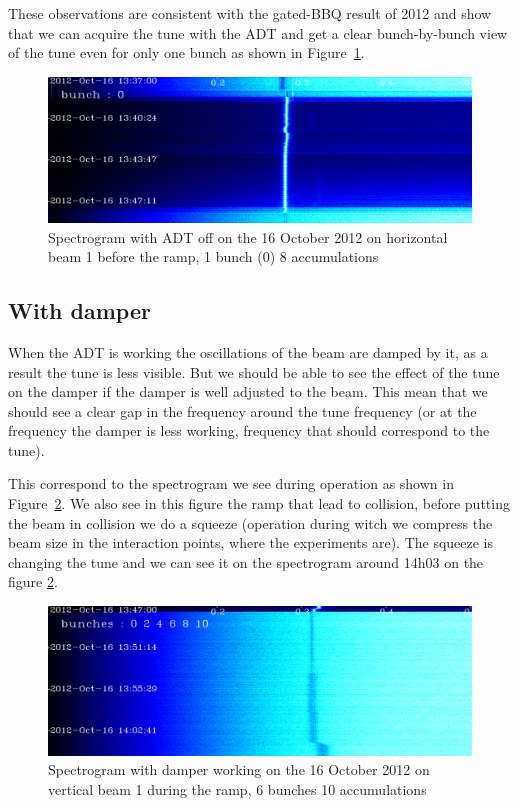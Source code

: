 These observations are consistent with the gated-\gls{BBQ} result of 2012 \cite{Valuch12} and show that we can acquire the tune with the \gls{ADT} and get a clear bunch-by-bunch view of the tune even for only one bunch as shown in Figure~\ref{fig:bunch_0_adt_off}.

\begin{figure}[H]
\caption{Spectrogram with ADT off on the 16 October 2012 on horizontal beam 1 before the ramp, 1 bunch (0) 8 accumulations}
\label{fig:bunch_0_adt_off}
\centering
\includegraphics[scale=0.3]{md-121016-hb1-m1-bunch000001-8acc-1337-1349.pdf}
\end{figure}

\subsection{With damper}

When the \gls{ADT} is working the oscillations of the beam are damped by it, as a result the tune is less visible. But we should be able to see the effect of the tune on the damper if the damper is well adjusted to the beam. This mean that we should see a clear gap in the frequency around the tune frequency (or at the frequency the damper is less working, frequency that should correspond to the tune).

This correspond to the spectrogram we see during operation as shown in Figure~\ref{fig:ramp}. We also see in this figure the ramp that lead to collision, before putting the beam in collision we do a squeeze (operation during witch we compress the beam size in the interaction points, where the experiments are). The squeeze is changing the tune and we can see it on the spectrogram around 14h03 on the figure \ref{fig:ramp}.

\begin{figure}[H]
\caption{Spectrogram with damper working on the 16 October 2012 on vertical beam 1 during the ramp, 6 bunches 10 accumulations}
\centering
\label{fig:ramp}
\includegraphics[scale=0.3]{md-121016-vb1-m1-6bunches-10acc-1347-1405-ramp.pdf}
\end{figure}


